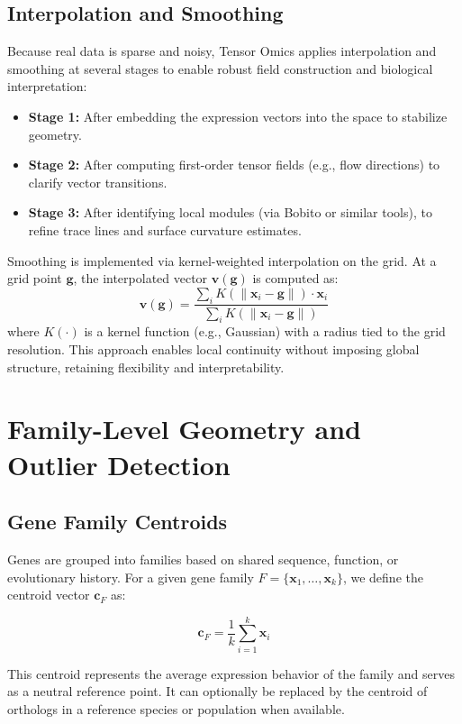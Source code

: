 \documentclass[11pt]{article}
\begin{document}
\subsection{Interpolation and Smoothing}

Because real data is sparse and noisy, Tensor Omics applies interpolation and smoothing at several stages to enable robust field construction and biological interpretation:

\begin{itemize}[leftmargin=1.5em]
    \item \textbf{Stage 1:} After embedding the expression vectors into the space to stabilize geometry.
    \item \textbf{Stage 2:} After computing first-order tensor fields (e.g., flow directions) to clarify vector transitions.
    \item \textbf{Stage 3:} After identifying local modules (via Bobito or similar tools), to refine trace lines and surface curvature estimates.
\end{itemize}

Smoothing is implemented via kernel-weighted interpolation on the grid. At a grid point $\mathbf{g}$, the interpolated vector $\mathbf{v}(\mathbf{g})$ is computed as:
\[
    \mathbf{v}(\mathbf{g}) = \frac{\sum_{i} K(\|\mathbf{x}_i - \mathbf{g}\|) \cdot \mathbf{x}_i}{\sum_{i} K(\|\mathbf{x}_i - \mathbf{g}\|)}
\]
where $K(\cdot)$ is a kernel function (e.g., Gaussian) with a radius tied to the grid resolution. This approach enables local continuity without imposing global structure, retaining flexibility and interpretability.

\section{Family-Level Geometry and Outlier Detection}

\subsection{Gene Family Centroids}

Genes are grouped into families based on shared sequence, function, or evolutionary history. For a given gene family $F = \{ \mathbf{x}_1, \ldots, \mathbf{x}_k \}$, we define the centroid vector $\mathbf{c}_F$ as:

\[
    \mathbf{c}_F = \frac{1}{k} \sum_{i=1}^{k} \mathbf{x}_i
\]

This centroid represents the average expression behavior of the family and serves as a neutral reference point. It can optionally be replaced by the centroid of orthologs in a reference species or population when available.
\end{document}
